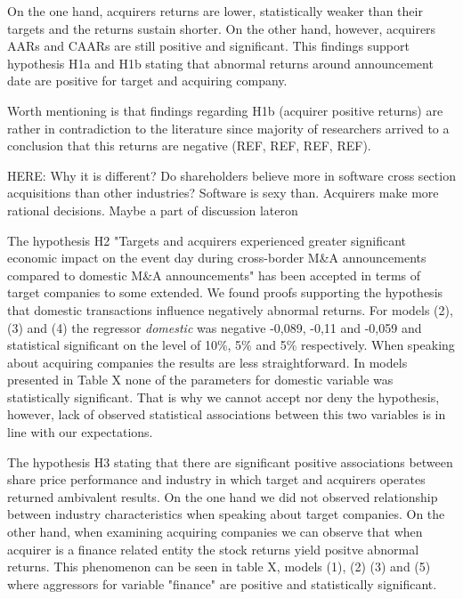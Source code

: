 \documentclass[preprint,10pt]{elsarticle}
\begin{document}


On the one hand, acquirers returns are lower, statistically weaker than their targets and the returns sustain shorter. On the other hand, however, acquirers AARs and CAARs are still positive and significant. This findings support hypothesis H1a and H1b stating that abnormal returns around announcement date are positive for target and acquiring company.


Worth mentioning is that findings regarding H1b (acquirer positive returns) are rather in contradiction to the literature since majority of researchers arrived to a conclusion that this returns are negative (REF, REF, REF, REF). 

HERE: Why it is different? Do shareholders believe more in software cross section acquisitions than other industries? Software is sexy than. Acquirers make more rational decisions. Maybe a part of discussion lateron


The hypothesis H2 "Targets and acquirers experienced greater significant economic impact on the event day during cross-border M\&A announcements compared to domestic M\&A announcements" has been accepted in terms of target companies to some extended. We found proofs supporting the hypothesis that domestic transactions influence negatively abnormal returns. For models (2), (3) and (4) the regressor \textit{domestic} was negative -0,089, -0,11 and -0,059 and statistical significant on the level of 10\%, 5\% and 5\% respectively.
When speaking about acquiring companies the results are less straightforward. In models presented in Table X none of the parameters for domestic variable was statistically significant. That is why we cannot accept nor deny the hypothesis, however, lack of observed statistical associations between this two variables is in line with our expectations. 



The hypothesis H3 stating that there are significant positive associations between share price performance and industry in which target and acquirers operates returned ambivalent results. On the one hand we did not observed relationship between industry characteristics when speaking about target companies. On the other hand, when examining acquiring companies we can observe that when acquirer is a finance related entity the stock returns yield positve abnormal returns. This phenomenon can be seen in table X, models (1), (2) (3) and (5) where aggressors for variable "finance" are positive and statistically significant.
\end{document}
